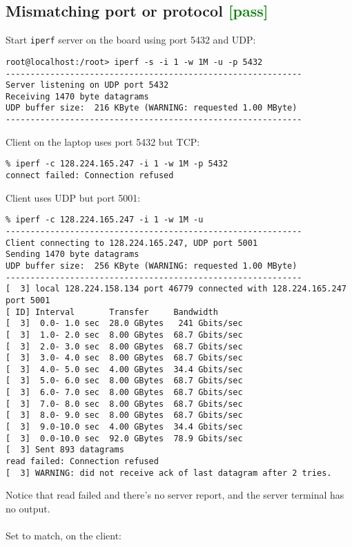 \documentclass[a4paper]{report}
\begin{document}
\subsection{Mismatching port or protocol \textcolor{green}{[pass]}}
Start {\tt iperf} server on the board using port 5432 and UDP:
\begin{lstlisting}
root@localhost:/root> iperf -s -i 1 -w 1M -u -p 5432
------------------------------------------------------------
Server listening on UDP port 5432
Receiving 1470 byte datagrams
UDP buffer size:  216 KByte (WARNING: requested 1.00 MByte)
------------------------------------------------------------
\end{lstlisting}
Client on the laptop uses port 5432 but TCP:
\begin{lstlisting}
% iperf -c 128.224.165.247 -i 1 -w 1M -p 5432
connect failed: Connection refused
\end{lstlisting}
Client uses UDP but port 5001:
\begin{lstlisting}
% iperf -c 128.224.165.247 -i 1 -w 1M -u
------------------------------------------------------------
Client connecting to 128.224.165.247, UDP port 5001
Sending 1470 byte datagrams
UDP buffer size:  256 KByte (WARNING: requested 1.00 MByte)
------------------------------------------------------------
[  3] local 128.224.158.134 port 46779 connected with 128.224.165.247 port 5001
[ ID] Interval       Transfer     Bandwidth
[  3]  0.0- 1.0 sec  28.0 GBytes   241 Gbits/sec
[  3]  1.0- 2.0 sec  8.00 GBytes  68.7 Gbits/sec
[  3]  2.0- 3.0 sec  8.00 GBytes  68.7 Gbits/sec
[  3]  3.0- 4.0 sec  8.00 GBytes  68.7 Gbits/sec
[  3]  4.0- 5.0 sec  4.00 GBytes  34.4 Gbits/sec
[  3]  5.0- 6.0 sec  8.00 GBytes  68.7 Gbits/sec
[  3]  6.0- 7.0 sec  8.00 GBytes  68.7 Gbits/sec
[  3]  7.0- 8.0 sec  8.00 GBytes  68.7 Gbits/sec
[  3]  8.0- 9.0 sec  8.00 GBytes  68.7 Gbits/sec
[  3]  9.0-10.0 sec  4.00 GBytes  34.4 Gbits/sec
[  3]  0.0-10.0 sec  92.0 GBytes  78.9 Gbits/sec
[  3] Sent 893 datagrams
read failed: Connection refused
[  3] WARNING: did not receive ack of last datagram after 2 tries.
\end{lstlisting}
Notice that read failed and there's no server report, and 
the server terminal has no output.\\\\
Set to match, on the client:
\end{document}

